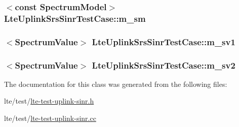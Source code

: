 \subsubsection[{\texorpdfstring{m\+\_\+sm}{m_sm}}]{$<$const {\bf Spectrum\+Model}$>$ Lte\+Uplink\+Srs\+Sinr\+Test\+Case\+::m\+\_\+sm\hspace{0.3cm}{\ttfamily [private]}}\hypertarget{classLteUplinkSrsSinrTestCase_aa5071a03e01428f289066683345609a3}{}\label{classLteUplinkSrsSinrTestCase_aa5071a03e01428f289066683345609a3}
\subsubsection[{\texorpdfstring{m\+\_\+sv1}{m_sv1}}]{$<${\bf Spectrum\+Value}$>$ Lte\+Uplink\+Srs\+Sinr\+Test\+Case\+::m\+\_\+sv1\hspace{0.3cm}{\ttfamily [private]}}\hypertarget{classLteUplinkSrsSinrTestCase_afab98b3888ccdb42ed33f951ceaa1812}{}\label{classLteUplinkSrsSinrTestCase_afab98b3888ccdb42ed33f951ceaa1812}
\subsubsection[{\texorpdfstring{m\+\_\+sv2}{m_sv2}}]{$<${\bf Spectrum\+Value}$>$ Lte\+Uplink\+Srs\+Sinr\+Test\+Case\+::m\+\_\+sv2\hspace{0.3cm}{\ttfamily [private]}}\hypertarget{classLteUplinkSrsSinrTestCase_ac2211e582f2eb062664fbdc6979e12d4}{}\label{classLteUplinkSrsSinrTestCase_ac2211e582f2eb062664fbdc6979e12d4}


The documentation for this class was generated from the following files\+:\begin{DoxyCompactItemize}
\item 
lte/test/\hyperlink{lte-test-uplink-sinr_8h}{lte-\/test-\/uplink-\/sinr.\+h}\item 
lte/test/\hyperlink{lte-test-uplink-sinr_8cc}{lte-\/test-\/uplink-\/sinr.\+cc}\end{DoxyCompactItemize}
